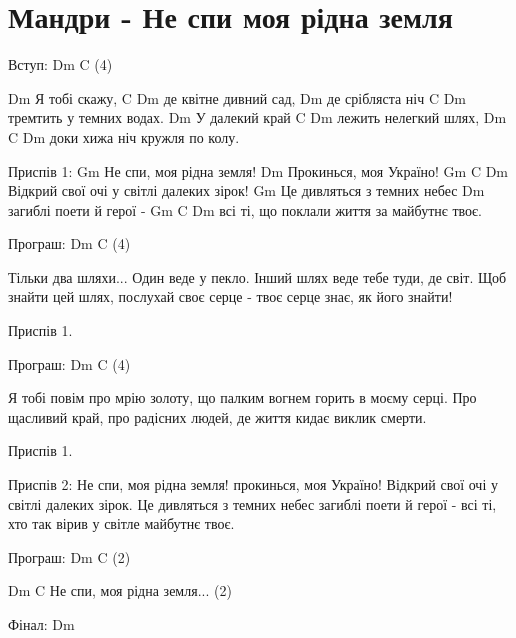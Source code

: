 \section{Мандри - Не спи моя рідна земля}
\begin{guitar}
Вступ:  Dm C  (4)

Dm
Я тобі скажу,
     C            Dm
де квітне дивний сад,
 Dm
де срібляста ніч
     C             Dm
тремтить у темних водах.
Dm
У далекий край
   C              Dm
лежить нелегкий шлях,
 Dm                C     Dm
доки хижа ніч кружля по колу.

Приспів 1:
     Gm
Не спи, моя рідна земля!
    Dm
Прокинься, моя Україно!
     Gm              C               Dm
Відкрий свої очі у світлі далеких зірок!
     Gm
Це дивляться з темних небес
   Dm
загиблі поети й герої -
     Gm                C                Dm
всі ті, що поклали життя за майбутнє твоє.

Програш:  Dm C  (4)

Тільки два шляхи...
Один веде у пекло.
Інший шлях веде
тебе туди, де світ.
Щоб знайти цей шлях,
послухай своє серце -
твоє серце знає,
як його знайти!

Приспів 1.

Програш:  Dm C  (4)

Я тобі повім
про мрію золоту,
що палким вогнем
горить в моєму серці.
Про щасливий край,
про радісних людей,
де життя кидає виклик смерти.

Приспів 1.

Приспів 2:
Не спи, моя рідна земля!
прокинься, моя Україно!
Відкрий свої очі у світлі далеких зірок.
Це дивляться з темних небес
загиблі поети й герої -
всі ті, хто так вірив у світле майбутнє твоє.

Програш:  Dm C  (2)

     Dm                 C
Не спи, моя рідна земля...  (2)

Фінал:  Dm
\end{guitar}

